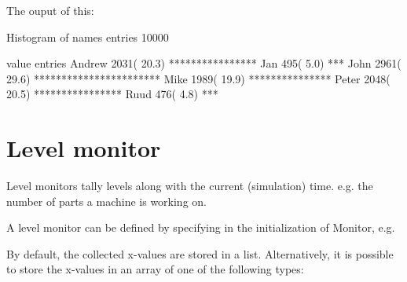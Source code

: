 \documentclass[letterpaper,10pt,english]{sphinxmanual}
\begin{document}
The ouput of this:

\begin{sphinxVerbatim}[commandchars=\\\{\}]
Histogram of names
entries          10000

value               entries
Andrew                 2031( 20.3\PYGZpc{}) ****************
Jan                     495(  5.0\PYGZpc{}) ***
John                   2961( 29.6\PYGZpc{}) ***********************
Mike                   1989( 19.9\PYGZpc{}) ***************
Peter                  2048( 20.5\PYGZpc{}) ****************
Ruud                    476(  4.8\PYGZpc{}) ***
\end{sphinxVerbatim}


\section{Level monitor}
\label{\detokenize{Monitor:level-monitor}}
Level monitors tally levels along with the current (simulation) time.
e.g. the number of parts a machine is working on.

A level monitor can be defined by specifying  in the initialization of Monitor, e.g.

\begin{sphinxVerbatim}[commandchars=\\\{\}]
    
\end{sphinxVerbatim}

By default, the collected x-values are stored in a list. Alternatively, it is possible to store
the x-values in an array of one of the following types:
\end{document}

